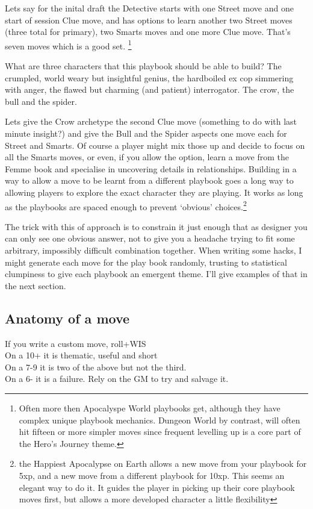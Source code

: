\documentclass{tufte-handout}
\begin{document}
Lets say for the inital draft the Detective starts with one Street move and one start of session Clue move, and has options to learn another two Street moves (three total for primary), two Smarts moves and one more Clue move. That's seven moves which is a good set. \footnote{ Often more then Apocalyspe World playbooks get, although they have complex unique playbook mechanics. Dungeon World by contrast, will often hit fifteen or more simpler moves since frequent levelling up is a core part of the Hero's Journey theme.}

What are three characters that this playbook should be able to build? The crumpled, world weary but insightful genius, the hardboiled ex cop simmering with anger, the flawed but charming (and patient) interrogator. The crow, the bull and the spider.

Lets give the Crow archetype the second Clue move (something to do with last minute insight?) and give the Bull and the Spider aspects one move each for Street and Smarts. Of course a player might mix those up and decide to focus on all the Smarts moves, or even, if you allow the option, learn a move from the Femme book and specialise in uncovering details in relationships. Building in a way to allow a move to be learnt from a different playbook goes a long way to allowing players to explore the exact character they are playing. It works as long as the playbooks are spaced enough to prevent `obvious' choices.\footnote{the Happiest Apocalypse on Earth allows a new move from your playbook for 5xp, and a new move from a different playbook for 10xp. This seems an elegant way to do it. It guides the player in picking up their core playbook moves first, but allows a more developed character a little flexibility}
 
The trick with this of approach is to constrain it just enough that as designer you can only see one obvious answer, not to give you a headache trying to fit some arbitrary, impossibly difficult combination together. 
When writing some hacks, I might generate each move for the play book randomly, trusting to statistical clumpiness to give each playbook an emergent theme. I'll give examples of that in the next section.
 
 \subsection{Anatomy of a move}
If you write a custom move, roll+WIS
\\On a 10+ it is thematic, useful and short 
\\On a 7-9  it is two of the above but not the third.
\\On a 6- it is a failure. Rely on the GM to try and salvage it.
\end{document}
